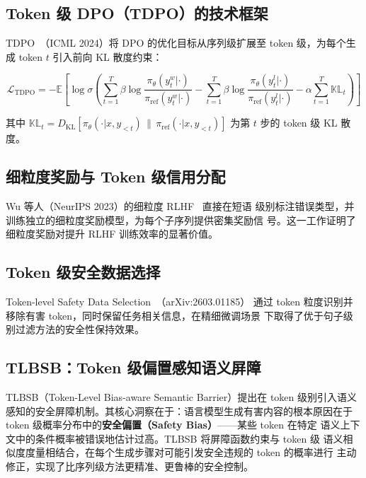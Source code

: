 \documentclass[12pt,a4paper,UTF8]{ctexart}
\newcommand{\E}{\mathbb{E}}
\newcommand{\sigmoid}{\sigma}
\newcommand{\piref}{\pi_{\mathrm{ref}}}
\newcommand{\pitheta}{\pi_{\theta}}
\begin{document}
\subsection{Token 级 DPO（TDPO）的技术框架}

TDPO~\cite{zeng2024tdpo}（ICML 2024）将 DPO 的优化目标从序列级扩展至
token 级，为每个生成 token $t$ 引入前向 KL 散度约束：

\begin{equation}
  \mathcal{L}_{\mathrm{TDPO}}
    = -\E\!\left[\log\sigmoid\!\left(
        \sum_{t=1}^T\beta\log\frac{\pitheta(y_t^w|\cdot)}{\piref(y_t^w|\cdot)}
        - \sum_{t=1}^T\beta\log\frac{\pitheta(y_t^l|\cdot)}{\piref(y_t^l|\cdot)}
        - \alpha\sum_{t=1}^T\mathbb{KL}_t
      \right)\right]
  \label{eq:tdpo}
\end{equation}

其中 $\mathbb{KL}_t = D_{\mathrm{KL}}[\pitheta(\cdot|x,y_{<t})\,\|\,
\piref(\cdot|x,y_{<t})]$ 为第 $t$ 步的 token 级 KL 散度。

\subsection{细粒度奖励与 Token 级信用分配}

Wu 等人（NeurIPS 2023）的细粒度 RLHF~\cite{wu2023finegrained} 直接在短语
级别标注错误类型，并训练独立的细粒度奖励模型，为每个子序列提供密集奖励信
号。这一工作证明了细粒度奖励对提升 RLHF 训练效率的显著价值。

\subsection{Token 级安全数据选择}

Token-level Safety Data Selection~\cite{tokensafety2025}（arXiv:2603.01185）
通过 token 粒度识别并移除有害 token，同时保留任务相关信息，在精细微调场景
下取得了优于句子级别过滤方法的安全性保持效果。

\subsection{TLBSB：Token 级偏置感知语义屏障}

TLBSB（Token-Level Bias-aware Semantic Barrier）提出在 token 级别引入语义
感知的安全屏障机制。其核心洞察在于：语言模型生成有害内容的根本原因在于
token 级概率分布中的\textbf{安全偏置（Safety Bias）}——某些 token 在特定
语义上下文中的条件概率被错误地估计过高。TLBSB 将屏障函数约束与 token 级
语义相似度度量相结合，在每个生成步骤对可能引发安全违规的 token 的概率进行
主动修正，实现了比序列级方法更精准、更鲁棒的安全控制。
\end{document}
